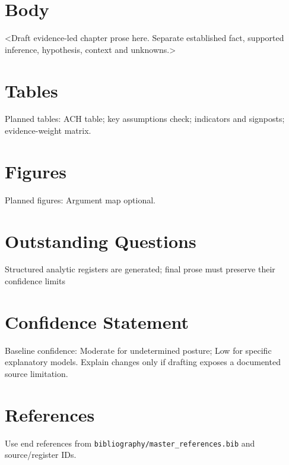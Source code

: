 \section{Body}
<Draft evidence-led chapter prose here. Separate established fact, supported inference, hypothesis, context and unknowns.>

\section{Tables}
Planned tables: ACH table; key assumptions check; indicators and signposts; evidence-weight matrix.

\section{Figures}
Planned figures: Argument map optional.

\section{Outstanding Questions}
Structured analytic registers are generated; final prose must preserve their confidence limits

\section{Confidence Statement}
Baseline confidence: Moderate for undetermined posture; Low for specific explanatory models. Explain changes only if drafting exposes a documented source limitation.

\section{References}
Use end references from \texttt{bibliography/master_references.bib} and source/register IDs.
